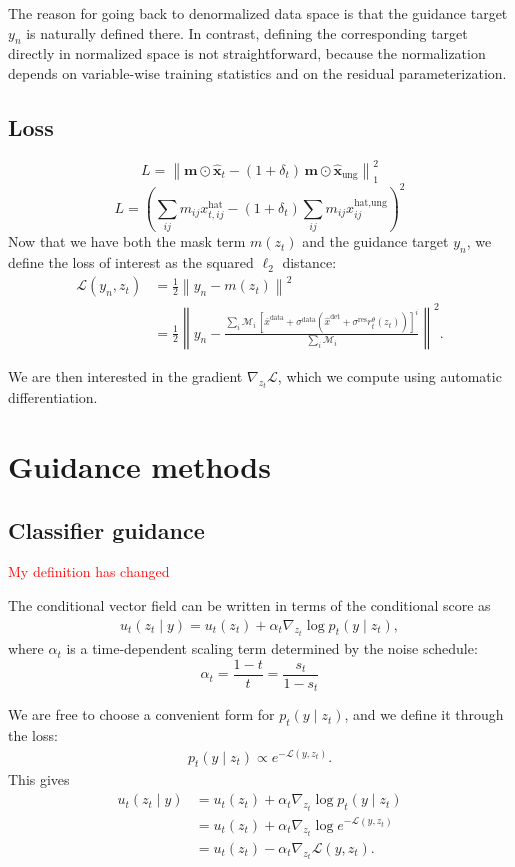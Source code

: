 \documentclass[a4paper,12pt]{article}
\begin{document}
The reason for going back to denormalized data space is that the guidance target $y_n$ is naturally defined there.
In contrast, defining the corresponding target directly in normalized space is not straightforward, because the normalization depends on variable-wise training statistics and on the residual parameterization.

\subsection{Loss}
$$
L = \left\| \mathbf{m} \odot \hat{\mathbf{x}}_t - (1+\delta_t)\,\mathbf{m} \odot \hat{\mathbf{x}}_{\mathrm{ung}} \right\|_1^2
$$
$$
L = \left( \sum_{ij} m_{ij} x^{\text{hat}}_{t,ij} - (1+\delta_t)\sum_{ij} m_{ij} x^{\text{hat,ung}}_{ij} \right)^2
$$
Now that we have both the mask term $m(z_t)$ and the guidance target $y_n$, we define the loss of interest as the squared $\ell_2$ distance:
\begin{align*} 
    \mathcal{L}(y_n, z_t) &= \frac{1}{2} \left\lVert y_n - m(z_t) \right\rVert^2 \\
    &= \frac{1}{2} \left\lVert
    y_n -
    \frac{\sum_i \mathcal{M}_i \, [\bar{x}^{\text{data}} + \sigma^{\text{data}}(\hat{x}^{\text{det}} + \sigma^{\text{res}} r_t^\theta(z_t))]^i}{\sum_i \mathcal{M}_i}
    \right\rVert^2.
\end{align*}

We are then interested in the gradient $\nabla_{z_t}\mathcal{L}$, which we compute using automatic differentiation.

\clearpage
\section{Guidance methods}
\subsection{Classifier guidance}

\textcolor{red}{My definition has changed}

The conditional vector field can be written in terms of the conditional score as
\begin{align*}
     u_t(z_t \mid y) = u_t(z_t) + \alpha_t \nabla_{z_t} \log p_t(y \mid z_t),
\end{align*}
where $\alpha_t$ is a time-dependent scaling term determined by the noise schedule:
$$\alpha_t = \frac{1-t}{t} = \frac{s_t}{1-s_t} $$

We are free to choose a convenient form for $p_t(y \mid z_t)$, and we define it through the loss:
\begin{align*}
    p_t(y \mid z_t) \propto e^{-\mathcal{L}(y, z_t)}.
\end{align*}
This gives
\begin{align*}
    u_t(z_t \mid y)
    &= u_t(z_t) + \alpha_t \nabla_{z_t} \log p_t(y \mid z_t) \\
    &= u_t(z_t) + \alpha_t \nabla_{z_t} \log e^{-\mathcal{L}(y, z_t)} \\
    &= u_t(z_t) - \alpha_t \nabla_{z_t} \mathcal{L}(y, z_t).
\end{align*}
\end{document}

